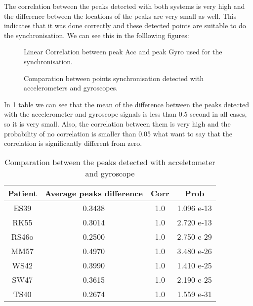 The correlation between the peaks detected with both systems is very high and the difference between the locations of the peaks are very small as well. This indicates that it was done correctly and these detected points are suitable to do the synchronisation. We can see this in the folllowing figures:

\begin{figure}[H]
	\centering
	\caption{Linear Correlation between peak Acc and peak Gyro used for the synchronisation.}
	\label{fig:corrAccGyroPoints}
\end{figure}

\begin{figure}[H]
	\centering
	\caption{Comparation between points synchronisation detected with accelerometers and gyroscopes.}
	\label{fig:barDiagram}
\end{figure}


In \ref{tab:comparationAccGyro} table we can see that the mean of the difference between the peaks detected with the accelerometer and gyroscope signals is less than 0.5 second in all cases, so it is very small. Also, the correlation between them is very high and the probability of no correlation is smaller than 0.05 what want to say that the correlation is significantly different from zero.

\begin{table}[h]
	\caption{Comparation between the peaks detected with acceletometer and gyroscope}	
	\centering
	\begin{tabular}{|c|c|c|c|}\hline
		
		Patient 				& Average peaks difference 	& Corr 	& Prob 	\\ \hline
		ES39 & 0.3438			& 1.0									& 1.096 e-13					\\
		RK55	& 0.3014			& 1.0									& 2.720 e-13				\\
		RS46o & 0.2500			& 1.0									& 2.750  e-29					\\
		MM57	& 0.4970			& 1.0									& 3.480 e-26					\\
		WS42  & 0.3990			& 1.0									& 1.410 e-25					\\
		SW47	& 0.3615			& 1.0									& 2.190 e-25					\\
		TS40  & 0.2674			& 1.0									& 1.559 e-31				\\ \hline
	\end{tabular}
	\label{tab:comparationAccGyro}
	
\end{table}

